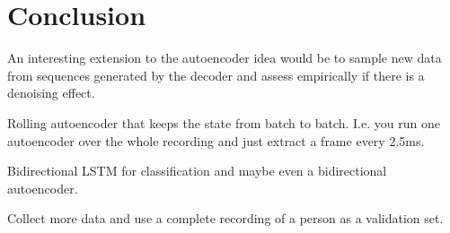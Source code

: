\chapter{Conclusion}
\label{chapter:conclusion}

An interesting extension to the autoencoder idea would be to sample new data
from sequences generated by the decoder and assess empirically if there is a
denoising effect.

Rolling autoencoder that keeps the state from batch to batch. I.e. you run one
autoencoder over the whole recording and just extract a frame every 2.5ms.

Bidirectional LSTM for classification and maybe even a bidirectional
autoencoder.

Collect more data and use a complete recording of a person as a validation set.
